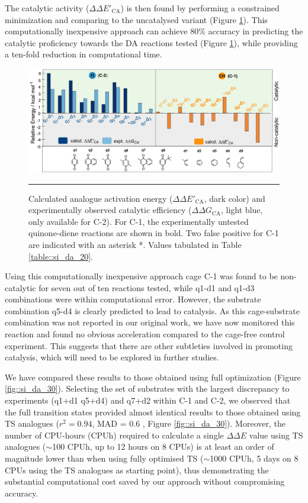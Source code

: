 \documentclass[../../main.tex]{subfiles}
\begin{document}
The catalytic activity ($\Delta\Delta E'_\text{CA}$) is then found by performing a constrained minimization and comparing to the uncatalysed variant (Figure \ref{fig::da_7}). This computationally inexpensive approach can achieve 80\% accuracy in predicting the catalytic proficiency towards the DA reactions tested (Figure \ref{fig::da_7}), while providing a ten-fold reduction in computational time.


\begin{figure}[h!]
	\vspace{0.4cm}
	\centering
	\includegraphics[width=\textwidth]{3/da//figs/fig7/fig7}
	\vspace{0.2cm}
	\hrule
	\caption{Calculated analogue activation energy ($\Delta\Delta E'_\text{CA}$, dark color) and experimentally observed catalytic efficiency ($\Delta\Delta G_\text{CA}$, light blue, only available for C-2). For C-1, the experimentally untested quinone-diene reactions are shown in bold. Two false positive for C-1 are indicated with an asterisk *. Values tabulated in Table \ref{table::si_da_20}.}
	\label{fig::da_7}
\end{figure}


Using this computationally inexpensive approach cage C-1 was found to be non-catalytic for seven out of ten reactions tested, while q1-d1 and q1-d3 combinations were within computational error. However, the substrate combination q5-d4 is clearly predicted to lead to catalysis. As this cage-substrate combination was not reported in our original work,\cite{MartCentelles2018} we have now monitored this reaction and found no obvious acceleration compared to the cage-free control experiment. This suggests that there are other subtleties involved in promoting catalysis, which will need to be explored in further studies. 

We have compared these results to those obtained using full optimization (Figure \ref{fig::si_da_30}). Selecting the set of substrates with the largest discrepancy to experiments (q1+d1 q5+d4) and q7+d2 within C-1 and C-2, we observed that the full transition states provided almost identical results to those obtained using TS analogues ($r^2 =0.94$, MAD = 0.6 \kcalx, Figure \ref{fig::si_da_30}). Moreover, the number of CPU-hours (CPUh) required to calculate a single $\Delta\Delta E$ value using TS analogues ($\sim$100 CPUh, up to 12 hours on 8 CPUs) is at least an order of magnitude lower than when using fully optimised TS ($\sim$1000 CPUh, 5 days on 8 CPUs using the TS analogues as starting point), thus demonstrating the substantial computational cost saved by our approach without compromising accuracy. 
\end{document}
